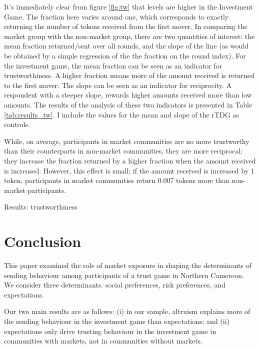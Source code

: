 It's immediately clear from figure \ref{fig:tw}  that levels are higher in the Investment Game. The fraction here varies around one, which corresponds to exactly returning the number of tokens received from the first mover. In comparing the market group with the non-market group, there are two quantities of interest: the mean fraction returned/sent over all rounds, and the slope of the line (as would be obtained by a simple regression of the the fraction on the round index). For the investment game, the mean fraction can be seen as an indicator for trustworthiness. A higher fraction means more of the amount received is returned to the first mover. The slope can be seen as an indicator for reciprocity. A respondent with a steeper slope, rewards higher amounts received more than low amounts. The results of the analysis of these two indicators is presented in Table \ref{tab:results_tw}. I include the values for the mean and slope of the rTDG as controls.

While, on average, participants in market communities are no more trustworthy than their counterparts in non-market communities, they are more reciprocal: they increase the fraction returned by a higher fraction when the amount received is increased. However, this effect is small: if the amount received is increased by 1 token, participants in market communities return 0.007 tokens more than non-market participants.


\begin{table}[htb]
	\small
	\caption{Results: trustworthiness}
	\label{tab:results_tw}
	\begin{center}
	
	\end{center}
\end{table}


\section{Conclusion}
This paper examined the role of market exposure in shaping the determinants of sending behaviour among participants of a trust game in Northern Cameroon. We consider three determinants: social preferences, risk preferences, and expectations. 

Our two main results are as follows: (i) in our sample, altruism explains more of the sending behaviour in the investment game than expectations; and (ii) expectations only drive trusting behaviour in the investment game in communities with markets, not in communities without markets.  

